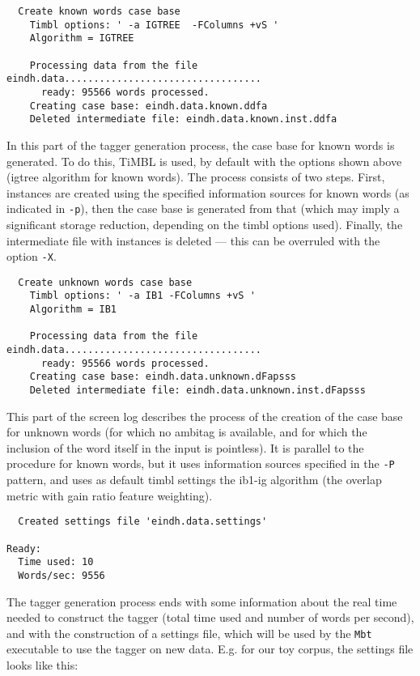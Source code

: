 \documentclass{report}
\begin{document}
{\small
\begin{verbatim}
  Create known words case base
    Timbl options: ' -a IGTREE  -FColumns +vS '
    Algorithm = IGTREE

    Processing data from the file eindh.data..................................
      ready: 95566 words processed.
    Creating case base: eindh.data.known.ddfa
    Deleted intermediate file: eindh.data.known.inst.ddfa
\end{verbatim}
}

In this part of the tagger generation process, the case base for known
words is generated. To do this, TiMBL is used, by default with
the options shown above ({\sc igtree} algorithm for known
words). The process consists of two steps. First, instances are
created using the specified information sources for known words (as
indicated in {\tt -p}), then the case base is generated from that (which
may imply a significant storage reduction, depending on the {\sc
timbl} options used). Finally, the intermediate file with instances is
deleted --- this can be overruled with the option {\tt -X}.

{\small
\begin{verbatim}
  Create unknown words case base
    Timbl options: ' -a IB1 -FColumns +vS '
    Algorithm = IB1

    Processing data from the file eindh.data..................................
      ready: 95566 words processed.
    Creating case base: eindh.data.unknown.dFapsss
    Deleted intermediate file: eindh.data.unknown.inst.dFapsss
\end{verbatim}
}

This part of the screen log describes the process of the creation of
the case base for unknown words (for which no ambitag is available,
and for which the inclusion of the word itself in the input is
pointless). It is parallel to the procedure for known words, but it
uses information sources specified in the {\tt -P} pattern, and uses
as default {\sc timbl} settings the {\sc ib1-ig} algorithm (the
overlap metric with gain ratio feature weighting).

{\small
\begin{verbatim}
  Created settings file 'eindh.data.settings'

Ready:
  Time used: 10
  Words/sec: 9556
\end{verbatim}
}

The tagger generation process ends with some information about the
real time needed to construct the tagger (total time used and number
of words per second), and with the construction of a settings file,
which will be used by the {\tt Mbt} executable to use the tagger on
new data. E.g. for our toy corpus, the settings file looks like this:
\end{document}
